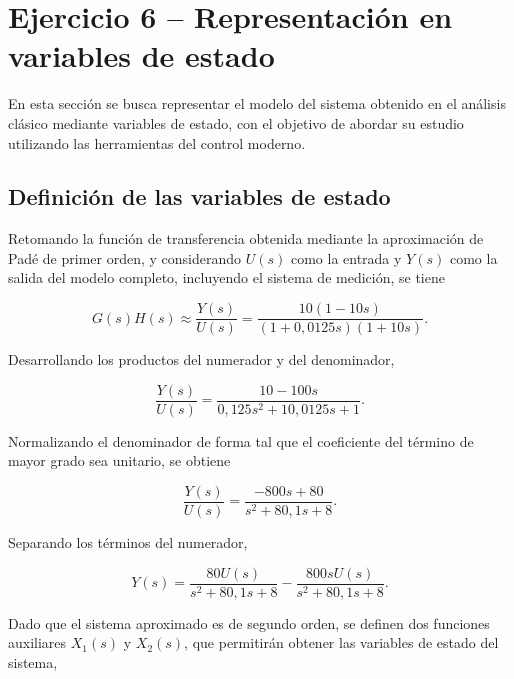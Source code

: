 \documentclass[10pt]{article}
\begin{document}

\clearpage
\setcounter{section}{6}
\setcounter{subsection}{0}
\section*{Ejercicio 6 -- Representación en variables de estado}

En esta sección se busca representar el modelo del sistema
obtenido en el análisis clásico mediante variables de estado,
con el objetivo de abordar su estudio utilizando las
herramientas del control moderno.

\subsection{Definición de las variables de estado}

Retomando la función de transferencia obtenida mediante
la aproximación de Padé de primer orden, y considerando
$U(s)$ como la entrada y $Y(s)$ como la salida del
modelo completo, incluyendo el sistema de medición, se tiene

\begin{equation}
    G(s)H(s)\approx\frac{Y(s)}{U(s)}=
    \frac{10(1-10s)}
    {(1+0{,}0125s)(1+10s)}.
\end{equation}

Desarrollando los productos del numerador y del denominador,

\begin{equation}
    \frac{Y(s)}{U(s)}=
    \frac{10-100s}{0{,}125s^2+10{,}0125s+1}.
\end{equation}

Normalizando el denominador de forma tal que el coeficiente
del término de mayor grado sea unitario, se obtiene

\begin{equation}
    \frac{Y(s)}{U(s)}=
    \frac{-800s+80}{s^2+80{,}1s+8}.
    \label{eq:ej6_transferencia}
\end{equation}

Separando los términos del numerador,

\begin{equation}
    Y(s)=
    \frac{80U(s)}{s^2+80{,}1s+8}
    -
    \frac{800sU(s)}{s^2+80{,}1s+8}.
\end{equation}

Dado que el sistema aproximado es de segundo orden,
se definen dos funciones auxiliares $X_1(s)$ y $X_2(s)$,
que permitirán obtener las variables de estado del sistema,
\end{document}
